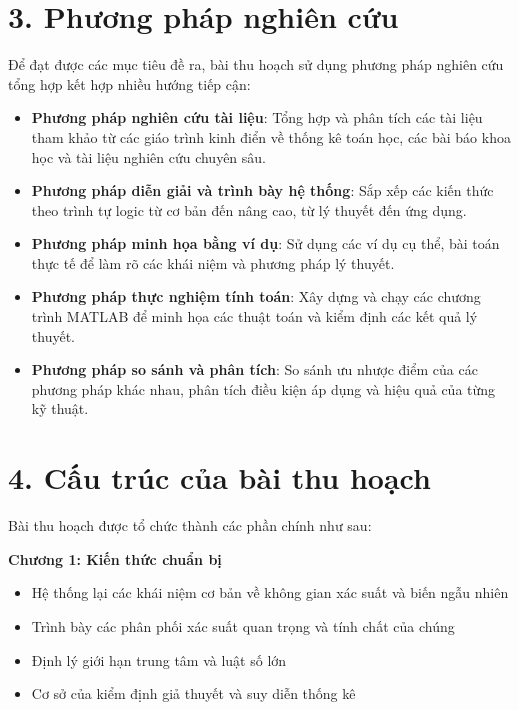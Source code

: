 \section*{3. Phương pháp nghiên cứu}

Để đạt được các mục tiêu đề ra, bài thu hoạch sử dụng phương pháp nghiên cứu tổng hợp kết hợp nhiều hướng tiếp cận:

\begin{itemize}
    \item \textbf{Phương pháp nghiên cứu tài liệu}: Tổng hợp và phân tích các tài liệu tham khảo từ các giáo trình kinh điển về thống kê toán học, các bài báo khoa học và tài liệu nghiên cứu chuyên sâu.
    
    \item \textbf{Phương pháp diễn giải và trình bày hệ thống}: Sắp xếp các kiến thức theo trình tự logic từ cơ bản đến nâng cao, từ lý thuyết đến ứng dụng.
    
    \item \textbf{Phương pháp minh họa bằng ví dụ}: Sử dụng các ví dụ cụ thể, bài toán thực tế để làm rõ các khái niệm và phương pháp lý thuyết.
    
    \item \textbf{Phương pháp thực nghiệm tính toán}: Xây dựng và chạy các chương trình MATLAB để minh họa các thuật toán và kiểm định các kết quả lý thuyết.
    
    \item \textbf{Phương pháp so sánh và phân tích}: So sánh ưu nhược điểm của các phương pháp khác nhau, phân tích điều kiện áp dụng và hiệu quả của từng kỹ thuật.
\end{itemize}

\section*{4. Cấu trúc của bài thu hoạch}

Bài thu hoạch được tổ chức thành các phần chính như sau:

\textbf{Chương 1: Kiến thức chuẩn bị}
\begin{itemize}
    \item Hệ thống lại các khái niệm cơ bản về không gian xác suất và biến ngẫu nhiên
    \item Trình bày các phân phối xác suất quan trọng và tính chất của chúng
    \item Định lý giới hạn trung tâm và luật số lớn
    \item Cơ sở của kiểm định giả thuyết và suy diễn thống kê
\end{itemize}

